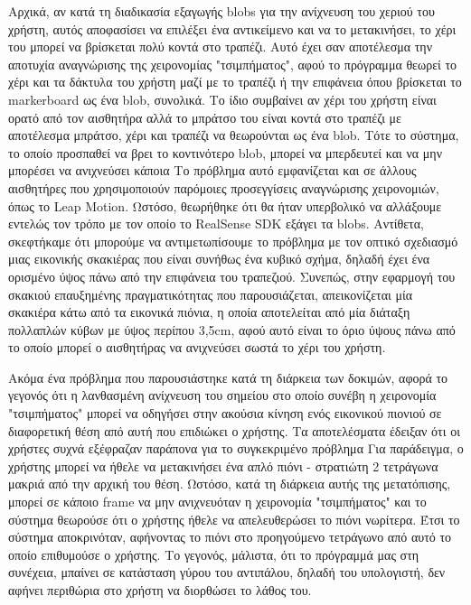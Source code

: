 Αρχικά, αν κατά τη διαδικασία εξαγωγής blobs για την ανίχνευση του χεριού του χρήστη, αυτός αποφασίσει να επιλέξει ένα αντικείμενο και να το μετακινήσει, το χέρι του μπορεί να βρίσκεται πολύ κοντά στο τραπέζι. Αυτό έχει σαν αποτέλεσμα την αποτυχία αναγνώρισης της χειρονομίας "τσιμπήματος", αφού το πρόγραμμα θεωρεί το χέρι και τα δάκτυλα του χρήστη μαζί με το τραπέζι ή την επιφάνεια όπου βρίσκεται το markerboard ως ένα blob, συνολικά. Το ίδιο συμβαίνει αν χέρι του χρήστη είναι ορατό από τον αισθητήρα αλλά το μπράτσο του είναι κοντά στο τραπέζι με αποτέλεσμα μπράτσο, χέρι και τραπέζι να θεωρούνται ως ένα blob. Τότε το σύστημα, το οποίο προσπαθεί να βρει το κοντινότερο blob, μπορεί να μπερδευτεί και να μην μπορέσει να ανιχνεύσει κάποια Το πρόβλημα αυτό εμφανίζεται και σε άλλους αισθητήρες που χρησιμοποιούν παρόμοιες προσεγγίσεις αναγνώρισης χειρονομιών, όπως το Leap Motion. Ωστόσο, θεωρήθηκε ότι θα ήταν υπερβολικό να αλλάξουμε εντελώς τον τρόπο με τον οποίο το RealSense SDK εξάγει τα blobs. Αντίθετα, σκεφτήκαμε ότι μπορούμε να αντιμετωπίσουμε το πρόβλημα με τον οπτικό σχεδιασμό μιας εικονικής σκακιέρας που είναι συνήθως ένα κυβικό σχήμα, δηλαδή έχει ένα ορισμένο ύψος πάνω από την επιφάνεια του τραπεζιού. Συνεπώς, στην εφαρμογή του σκακιού επαυξημένης πραγματικότητας που παρουσιάζεται, απεικονίζεται μία σκακιέρα κάτω από τα εικονικά πιόνια, η οποία αποτελείται από μία διάταξη πολλαπλών κύβων με ύψος περίπου 3,5cm, αφού αυτό είναι το όριο ύψους πάνω από το οποίο μπορεί ο αισθητήρας να ανιχνεύσει σωστά το χέρι του χρήστη. 


Ακόμα ένα πρόβλημα που παρουσιάστηκε κατά τη διάρκεια των δοκιμών, αφορά το γεγονός ότι η λανθασμένη ανίχνευση του σημείου στο οποίο συνέβη η χειρονομία "τσιμπήματος" μπορεί να οδηγήσει στην ακούσια κίνηση ενός εικονικού πιονιού σε διαφορετική θέση από αυτή που επιδιώκει ο χρήστης. Τα αποτελέσματα έδειξαν ότι οι χρήστες συχνά εξέφραζαν παράπονα για το συγκεκριμένο πρόβλημα Για παράδειγμα, ο χρήστης μπορεί να ήθελε να μετακινήσει ένα απλό πιόνι - στρατιώτη 2 τετράγωνα μακριά από την αρχική του θέση. Ωστόσο, κατά τη διάρκεια αυτής της μετατόπισης, μπορεί σε κάποιο frame να μην ανιχνευόταν η χειρονομία "τσιμπήματος" και το σύστημα θεωρούσε ότι ο χρήστης ήθελε να απελευθερώσει το πιόνι νωρίτερα. Έτσι το σύστημα αποκρινόταν, αφήνοντας το πιόνι στο προηγούμενο τετράγωνο από αυτό το οποίο επιθυμούσε ο χρήστης. Το γεγονός, μάλιστα, ότι το πρόγραμμά μας στη συνέχεια, μπαίνει σε κατάσταση γύρου του αντιπάλου, δηλαδή του υπολογιστή, δεν αφήνει περιθώρια στο χρήστη να διορθώσει το λάθος του. 


